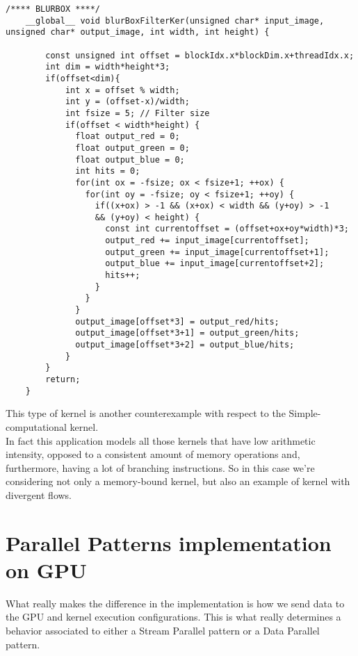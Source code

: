 	\begin{lstlisting}[caption={Implementation for Image processing Kernel (Blur Box Algorithm)}]
	/**** BLURBOX ****/
	__global__ void blurBoxFilterKer(unsigned char* input_image, unsigned char* output_image, int width, int height) {
	
		const unsigned int offset = blockIdx.x*blockDim.x+threadIdx.x;
		int dim = width*height*3;
		if(offset<dim){
			int x = offset % width;
			int y = (offset-x)/width;
			int fsize = 5; // Filter size
			if(offset < width*height) {
			  float output_red = 0;
			  float output_green = 0;
			  float output_blue = 0;
			  int hits = 0;
			  for(int ox = -fsize; ox < fsize+1; ++ox) {
			    for(int oy = -fsize; oy < fsize+1; ++oy) {
				  if((x+ox) > -1 && (x+ox) < width && (y+oy) > -1 
				  && (y+oy) < height) {
					const int currentoffset = (offset+ox+oy*width)*3;
					output_red += input_image[currentoffset]; 
					output_green += input_image[currentoffset+1];
					output_blue += input_image[currentoffset+2];
					hits++;
				  }
				}
			  }
			  output_image[offset*3] = output_red/hits;
			  output_image[offset*3+1] = output_green/hits;
			  output_image[offset*3+2] = output_blue/hits;
			}
		}
		return;
	}
	\end{lstlisting}
	This type of kernel is another counterexample with respect to the Simple-computational kernel.\\
	In fact this application models all those kernels that have low arithmetic intensity, opposed to a consistent amount of memory operations and, furthermore, having a lot of branching instructions. So in this case we're considering not only a memory-bound kernel, but also an example of kernel with divergent flows.
	
	
\section{Parallel Patterns implementation on GPU}
What really makes the difference in the implementation is how we send data to the GPU and kernel execution configurations.
This is what really determines a behavior associated to either a Stream Parallel pattern or a Data Parallel pattern.


